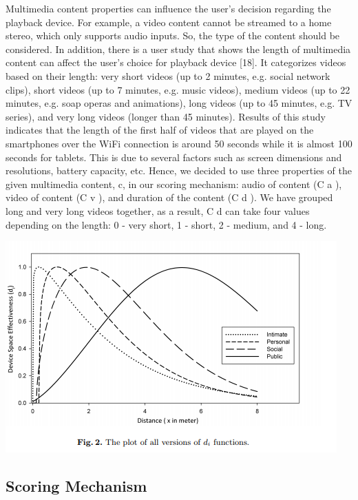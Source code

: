 \documentclass[runningheads,a4paper]{llncs}
\begin{document}
Multimedia content properties can influence the user’s decision regarding the
playback device. For example, a video content cannot be streamed to a home
stereo, which only supports audio inputs. So, the type of the content should be
considered. In addition, there is a user study that shows the length of multimedia
content can affect the user’s choice for playback device [18]. It categorizes videos
based on their length: very short videos (up to 2 minutes, e.g. social network
clips), short videos (up to 7 minutes, e.g. music videos), medium videos (up to
22 minutes, e.g. soap operas and animations), long videos (up to 45 minutes,
e.g. TV series), and very long videos (longer than 45 minutes). Results of this
study indicates that the length of the first half of videos that are played on the
smartphones over the WiFi connection is around 50 seconds while it is almost
100 seconds for tablets. This is due to several factors such as screen dimensions
and resolutions, battery capacity, etc. Hence, we decided to use three properties
of the given multimedia content, c, in our scoring mechanism: audio of content
(C
a
), video of content (C
v
), and duration of the content (C
d
). We have grouped
long and very long videos together, as a result, C
d
can take four values depending
on the length: 0 - very short, 1 - short, 2 - medium, and 4 - long.

\includegraphics{fig2.png}

\subsection{Scoring Mechanism}
\end{document}
